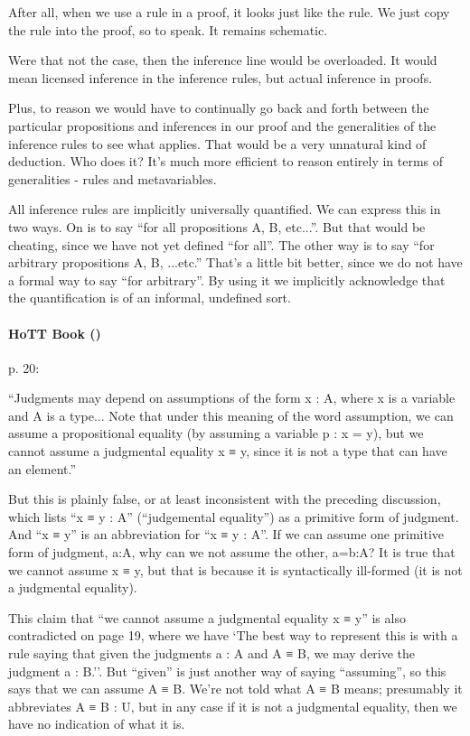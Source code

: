 \documentclass{article}
\begin{document}
After all, when we use a rule in a proof, it looks just like the rule.
We just copy the rule into the proof, so to speak. It remains schematic.

Were that not the case, then the inference line would be overloaded.
It would mean licensed inference in the inference rules, but actual
inference in proofs.

Plus, to reason we would have to continually go back and forth between
the particular propositions and inferences in our proof and the
generalities of the inference rules to see what applies. That would be
a very unnatural kind of deduction. Who does it? It's much more
efficient to reason entirely in terms of generalities - rules and
metavariables.

All inference rules are implicitly universally quantified. We can
express this in two ways. On is to say ``for all propositions A, B,
etc...''. But that would be cheating, since we have not yet defined
``for all''. The other way is to say ``for arbitrary propositions A,
B, ...etc.'' That's a little bit better, since we do not have a formal
way to say ``for arbitrary''. By using it we implicitly acknowledge
that the quantification is of an informal, undefined sort.

\paragraph{HoTT Book (\parencite{hottbook})\newline}

p. 20:
\begin{displayquote}
``Judgments may depend on assumptions of the form x :
A, where x is a variable and A is a type... Note that under this
meaning of the word assumption, we can assume a propositional equality
(by assuming a variable p : x = y), but we cannot assume a judgmental
equality x ≡ y, since it is not a type that can have an element.''
\end{displayquote}

But this is plainly false, or at least inconsistent with the preceding
discussion, which lists ``x ≡ y : A'' (``judgemental equality'') as a
primitive form of judgment. And ``x ≡ y'' is an abbreviation for ``x ≡
y : A''. If we can assume one primitive form of judgment, a:A, why can
we not assume the other, a=b:A? It is true that we cannot assume x ≡
y, but that is because it is syntactically ill-formed (it is not a
judgmental equality).

This claim that ``we cannot assume a judgmental equality x ≡ y'' is
also contradicted on page 19, where we have `The best way to represent
this is with a rule saying that given the judgments a : A and A ≡ B,
we may derive the judgment a : B.''. But ``given'' is just another way
of saying ``assuming'', so this says that we can assume A ≡ B. We're
not told what A ≡ B means; presumably it abbreviates A ≡ B : U, but in
any case if it is not a judgmental equality, then we have no
indication of what it is.
\end{document}
